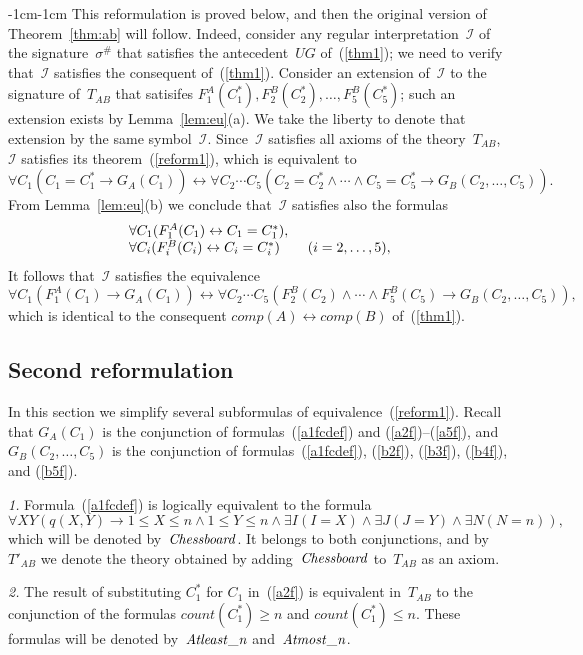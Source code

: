 \documentclass[11pt]{article}
\def\ug{\mathit{UG}}
\def\lrar{\leftrightarrow}
\def\ba{\begin{array}}
\def\ea{\end{array}}
\def\I{\mathcal{I}}
\newcommand{\co}{\ensuremath{\mathit{count}}}
\def\dOne{\mathit{Chessboard\/}}
\def\aTwofgeq{\mathit{Atleast\_n\/}}
\def\aTwofleq{\mathit{Atmost\_n\/}}
\begin{document}
\begin{adjustwidth}{-1cm}{-1cm}
\medskip
This reformulation is proved below, and then the
original version of Theorem~\ref{thm:ab}
will follow.  Indeed, consider any regular interpretation~$\I$
of the signature~$\sigma^\#$ that satisfies the antecedent~$\ug$
of~(\ref{thm1}); we need to verify that~$\I$ satisfies the consequent
of~(\ref{thm1}).
Consider an extension of~$\I$ to the signature of~$T_{AB}$ that
satisifes $F^A_1(C_1^*),F^B_2(C_2^*),\dots,F_5^B(C_5^*)$; such an extension exists by
Lemma~\ref{lem:eu}(a). We take the liberty to denote that
extension by the same symbol~$\I$. Since~$\I$ satisfies all axioms of
the theory~$T_{AB}$,
$\I$ satisfies its theorem~(\ref{reform1}), which is equivalent to
$$\forall C_1( C_1=C_1^*\to G_A(C_1)) \lrar
\forall C_2\cdots C_5(C_2=C_2^* \land\cdots \land C_5=C_5^* \to
G_B(C_2,\dots,C_5)).$$
From Lemma~\ref{lem:eu}(b) we conclude
that~$\I$ satisfies also the formulas
$$
\ba l
\forall C_1(F^A_1(C_1) \lrar C_1=C^*_1),\\
\forall C_i(F^B_i(C_i) \lrar C_i=C^*_i) \qquad (i=2,\dots,5),\\
\ea
$$
It follows that~$\I$ satisfies the equivalence
$$\forall C_1(F^A_1(C_1) \to G_A(C_1)) \lrar
\forall C_2\cdots C_5(F^B_2(C_2)\land\cdots \land F^B_5(C_5)\to
G_B(C_2,\dots,C_5)),$$
which is identical to the consequent $\mathit{comp}(A)\lrar\mathit{comp}(B)$
of~(\ref{thm1}).

\subsection{Second reformulation}\label{sec:reformThm1}

In this section we simplify several subformulas of equivalence~(\ref{reform1}).
Recall that $G_A(C_1)$ is the conjunction of
formulas~(\ref{a1fcdef}) and (\ref{a2f})--(\ref{a5f}), and
$G_B(C_2,\dots, C_5)$ is the conjunction of
formulas~(\ref{a1fcdef}), (\ref{b2f}), (\ref{b3f}), (\ref{b4f}),
and (\ref{b5f}).

\medskip\noindent\emph{1.}
Formula~(\ref{a1fcdef}) is logically equivalent to the formula
$$
\forall X Y (q(X,Y) \to
1 \leq X \leq n \land 1 \leq Y \leq n \land \exists I(I=X)
\land \exists J(J=Y) \land \exists N(N=n)),
$$
which will be denoted by~$\dOne$.  It belongs to both
conjunctions, and by~$T'_{AB}$ we denote the theory obtained by adding~$\dOne$
to~$T_{AB}$ as an axiom.

\medskip\noindent\emph{2.}
The result of substituting $C_1^*$ for $C_1$ in~(\ref{a2f}) is equivalent
in~$T_{AB}$ to
the conjunction of the formulas
$\co(C^*_1)\geq n$ and $\co(C^*_1)\leq n$.  These formulas will be
denoted by~$\aTwofgeq$ and~$\aTwofleq$.


\end{adjustwidth}
\end{document}
